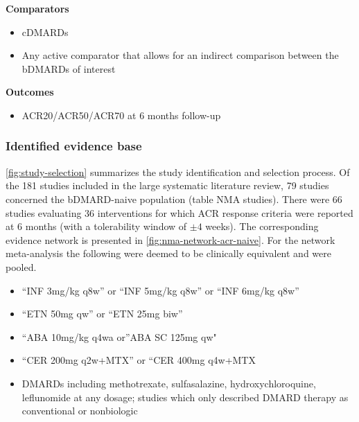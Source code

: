 \documentclass[11pt,final,fleqn]{article}\usepackage[]{graphicx}\usepackage[]{color}
\theoremstyle{plain}
\begin{document}
\begin{appendices}
\textbf{Comparators}

\begin{itemize}
\item
  cDMARDs
\item
  Any active comparator that allows for an indirect comparison between
  the bDMARDs of interest
\end{itemize}

\textbf{Outcomes}

\begin{itemize}
\item
  ACR20/ACR50/ACR70 at 6 months follow-up
\end{itemize}

\subsubsection{Identified evidence base}\label{identified-evidence-base}

\autoref{fig:study-selection} summarizes the study identification and
selection process. Of the 181 studies included in the large systematic
literature review, 79 studies concerned the bDMARD-naive population
(table NMA studies). There were 66 studies evaluating 36 interventions
for which ACR response criteria were reported at 6 months (with a
tolerability window of \(\pm 4\) weeks). The corresponding evidence
network is presented in \autoref{fig:nma-network-acr-naive}. For the
network meta-analysis the following were deemed to be clinically
equivalent and were pooled.

\begin{itemize}
\item
  ``INF 3mg/kg q8w'' or ``INF 5mg/kg q8w'' or ``INF 6mg/kg q8w''
\item
  ``ETN 50mg qw'' or ``ETN 25mg biw''
\item
  ``ABA 10mg/kg q4wa or''ABA SC 125mg qw"
\item
  ``CER 200mg q2w+MTX'' or ``CER 400mg q4w+MTX
\item
  DMARDs including methotrexate, sulfasalazine, hydroxychloroquine,
  leflunomide at any dosage; studies which only described DMARD therapy
  as conventional or nonbiologic
\end{itemize}


\end{appendices}
\end{document}
